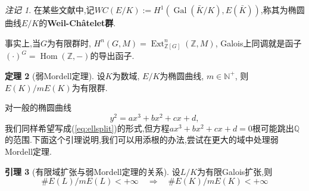 \documentclass[12pt,A4paper,oneside,reqno]{amsart}
\numberwithin{equation}{section}
\theoremstyle{definition}
\newtheorem{theorem}{定理}[section]
\newtheorem{lemma}[theorem]{引理}
\theoremstyle{plain}
\theoremstyle{plain}
\numberwithin{equation}{section}
\theoremstyle{remark}
\newtheorem{remark}[theorem]{注记}
\newcommand{\Hom}{\operatorname{Hom}}
\newcommand{\Ext}{\operatorname{Ext}}
\newcommand{\Gal}{\operatorname{Gal}}
\begin{document}
\begin{remark}
	在某些文献中,记$WC(E/K):= H^1(\Gal (\bar{K}/K),E(\bar{K}))$,称其为椭圆曲线$E/K$的\textbf{Weil-Ch\^{a}telet群}.
	
	事实上,当$G$为有限群时, $H^n(G,M)=\Ext^n_{\mathbb{Z}[G]}(\mathbb{Z},M)$, Galois上同调就是函子$(\cdot)^G=\Hom(\mathbb{Z},-)$的导出函子.
\end{remark}
\begin{theorem}[弱Mordell定理]
	设$K$为数域, $E/K$为椭圆曲线, $m \in \mathbb{N}^+$, 则$E(K)/mE(K)$为有限群.
\end{theorem}
对一般的椭圆曲线
$$y^2=ax^3+bx^2+cx+d, $$
我们同样希望写成(\ref{eq:ellsplit})的形式,但方程$ax^3+bx^2+cx+d=0$根可能跳出$\mathbb{Q}$的范围.下面这个引理说明,我们可以用添根的办法,尝试在更大的域中处理弱Mordell定理.
\begin{lemma}[有限域扩张与弱Mordell定理的关系]
	设$L/K$为有限Galois扩张,则
	$$\#E(L)/mE(L) < + \infty \quad \Longrightarrow \quad \#E(K)/mE(K) < + \infty$$
\end{lemma}
\end{document}

